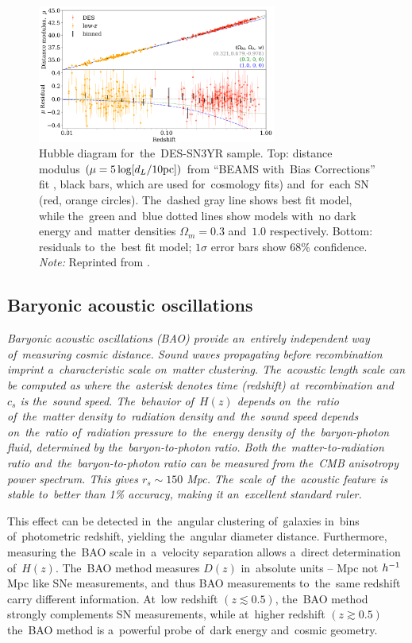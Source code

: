 \begin{figure}[hbt]
    \centering
    \includegraphics[width=0.7\textwidth]{cosmo_evol/DES_SNe_results.png}
    \caption{Hubble diagram for~the~DES-SN3YR sample. Top: distance modulus $(\mu =5\log [d_L/10\rm{pc}])$ from ``BEAMS with~Bias Corrections'' fit \parencite{Kessler_2017}, black bars, which are used for~cosmology fits) and~for~each SN (red, orange circles). The~dashed gray line shows best fit model, while the~green and~blue dotted lines show models with~no dark energy and~matter densities $\Omega_m = 0.3$ and~$1.0$ respectively. Bottom: residuals to~the~best fit model; $1\sigma$ error bars show 68\% confidence. \textit{Note:} Reprinted from \textcite{Abbott_2019}.}
    \label{fig:des_sne_results}
\end{figure}
\subsection[Baryonic acoustic oscillations]{Baryonic acoustic oscillations}
\label{sec:bao}
{\itshape
Baryonic acoustic oscillations (BAO) provide an~entirely independent way of~measuring cosmic distance. Sound waves propagating before recombination imprint a~characteristic scale on~matter clustering. The~acoustic length scale can be computed as
where the~asterisk denotes time (redshift) at~recombination and~$c_s$ is the~sound speed. The~behavior of~$H(z)$ depends on~the~ratio of~the~matter density to~radiation density and~the~sound speed depends on~the~ratio of~radiation pressure to~the~energy density of~the~baryon-photon fluid, determined by the~baryon-to-photon ratio. Both the~matter-to-radiation ratio and~the~baryon-to-photon ratio can be measured from the~CMB anisotropy power spectrum. This gives $r_s\sim150$ Mpc. The~scale of~the~acoustic feature is stable to~better than 1\% accuracy, making it an~excellent standard ruler.

This effect can be detected in~the~angular clustering of~galaxies in~bins of~photometric redshift, yielding the~angular diameter distance. Furthermore, measuring the~BAO scale in~a~velocity separation allows a~direct determination of~$H(z)$. The~BAO method measures $D(z)$ in~absolute units -- Mpc not $h^{-1}$ Mpc like SNe measurements, and~thus BAO measurements to~the~same redshift carry different information. At~low redshift $(z\lesssim0.5)$, the~BAO method strongly complements SN measurements, while at~higher redshift $(z\gtrsim0.5)$ the~BAO method is a~powerful probe of~dark energy and~cosmic geometry.
}

